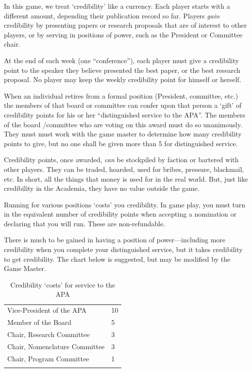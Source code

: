 \begin{refsection}
In this game, we treat ‘credibility’ like a currency. Each player starts with a different amount, depending their publication record so far. Players \emph{gain} credibility by presenting papers or research proposals that are of interest to other players, or by serving in positions of power, such as the President or Committee chair.

At the end of each week (one “conference”), each player must give a credibility point to the speaker they believe presented the best paper, or the best research proposal. No player may keep the weekly credibility point for himself or herself. 

When an individual retires from a formal position (President, committee, etc.) the members of that board or committee can confer upon that person a ‘gift’ of credibility points for his or her “distinguished service to the APA”. The members of the board \slash  committee who are voting on this award must do so unanimously. They must must work with the game master to determine how many credibility points to give, but no one shall be given more than 5 for distinguished service.

Credibility points, once awarded, \emph{can} be stockpiled by faction or bartered with other players. They can be traded, hoarded, used for bribes, pressure, blackmail, etc. In short, all the things that money is used for in the real world. But, just like credibility in the Academia, they have no value outside the game.

Running for various positions ‘costs’ you credibility. In game play, you must turn in the equivalent number of credibility points when accepting a nomination or declaring that you will run. These are non-refundable.

There is much to be gained in having a position of power---including more credibility when you complete your distinguished service, but it takes credibility to get credibility. The chart below is suggested, but may be modified by the Game Master.

\begin{longtable}[!t]{ | P{7cm} | P{2cm}  | } \hline
{}& \\ \hline 
Vice-President of the APA& 10 \\ \hline
Member of the Board & 5 \\ \hline
Chair, Research Committee & 3 \\ \hline
Chair, Nomenclature Committee & 3 \\ \hline
Chair, Program Committee & 1 \\ \hline
\caption{Credibility ‘costs’ for service to the APA}
\label{table: credibilitymenu}  
\end{longtable} 


\end{refsection}
